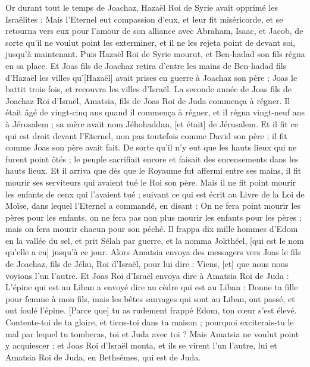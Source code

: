 \begin{multicols}{2}
Or durant tout le temps de Joachaz, Hazaël Roi de Syrie avait opprimé les Israëlites ;
Mais l'Eternel eut compassion d'eux, et leur fit miséricorde, et se retourna vers eux pour l'amour de son alliance avec Abraham, Isaac, et Jacob, de sorte qu'il ne voulut point les exterminer, et il ne les rejeta point de devant soi, jusqu'à maintenant.
Puis Hazaël Roi de Syrie mourut, et Ben-hadad son fils régna en sa place.
Et Joas fils de Joachaz retira d'entre les mains de Ben-hadad fils d'Hazaël les villes qu'[Hazaël] avait prises en guerre à Joachaz son père ; Joas le battit trois fois, et recouvra les villes d'Israël.
\VerseOne{}La seconde année de Joas fils de Joachaz Roi d'Israël, Amatsia, fils de Joas Roi de Juda commença à régner.
Il était âgé de vingt-cinq ans quand il commença à régner, et il régna vingt-neuf ans à Jérusalem ; sa mère avait nom Jéhohaddan, [et était] de Jérusalem.
Et il fit ce qui est droit devant l'Eternel, non pas toutefois comme David son père ; il fit comme Joas son père avait fait.
De sorte qu'il n'y eut que les hauts lieux qui ne furent point ôtés ; le peuple sacrifiait encore et faisait des encensements dans les hauts lieux.
Et il arriva que dès que le Royaume fut affermi entre ses mains, il fit mourir ses serviteurs qui avaient tué le Roi son père.
Mais il ne fit point mourir les enfants de ceux qui l'avaient tué ; suivant ce qui est écrit au Livre de la Loi de Moïse, dans lequel l'Eternel a commandé, en disant : On ne fera point mourir les pères pour les enfants, on ne fera pas non plus mourir les enfants pour les pères ; mais on fera mourir chacun pour son péché.
Il frappa dix mille hommes d'Edom en la vallée du sel, et prit Sélah par guerre, et la nomma Jokthéel, [qui est le nom qu'elle a eu] jusqu'à ce jour.
Alors Amatsia envoya des messagers vers Joas le fils de Joachaz, fils de Jéhu, Roi d'Israël, pour lui dire : Viens, [et] que nous nous voyions l'un l'autre.
Et Joas Roi d'Israël envoya dire à Amatsia Roi de Juda : L'épine qui est au Liban a envoyé dire au cèdre qui est au Liban : Donne ta fille pour femme à mon fils, mais les bêtes sauvages qui sont au Liban, ont passé, et ont foulé l'épine.
[Parce que] tu as rudement frappé Edom, ton cœur s'est élevé. Contente-toi de ta gloire, et tiens-toi dans ta maison ; pourquoi exciterais-tu le mal par lequel tu tomberas, toi et Juda avec toi ?
Mais Amatsia ne voulut point y acquiescer ; et Joas Roi d'Israël monta, et ils se virent l'un l'autre, lui et Amatsia Roi de Juda, en Bethsémes, qui est de Juda.

\end{multicols}
